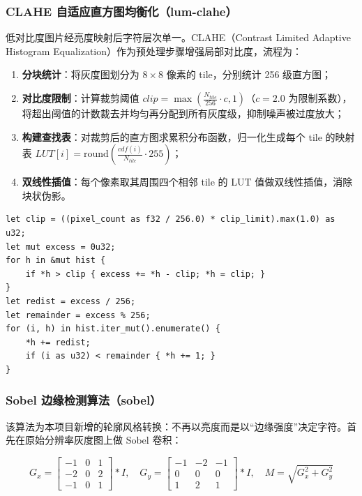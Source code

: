 \documentclass{SYSUReport}
\begin{document}
\subsubsection{CLAHE 自适应直方图均衡化（lum-clahe）}

低对比度图片经亮度映射后字符层次单一。CLAHE（Contrast Limited Adaptive Histogram Equalization）作为预处理步骤增强局部对比度，流程为：

\begin{enumerate}
    \item \textbf{分块统计}：将灰度图划分为 $8 \times 8$ 像素的 tile，分别统计 256 级直方图；
    \item \textbf{对比度限制}：计算裁剪阈值 $clip = \max(\frac{N_{tile}}{256} \cdot c, 1)$（$c=2.0$ 为限制系数），将超出阈值的计数裁去并均匀再分配到所有灰度级，抑制噪声被过度放大；
    \item \textbf{构建查找表}：对裁剪后的直方图求累积分布函数，归一化生成每个 tile 的映射表 $LUT[i] = \mathrm{round}(\frac{cdf(i)}{N_{tile}} \cdot 255)$；
    \item \textbf{双线性插值}：每个像素取其周围四个相邻 tile 的 LUT 值做双线性插值，消除块状伪影。
\end{enumerate}

\begin{lstlisting}[caption={直方图裁剪与再分配（ascii/clahe.rs）}]
let clip = ((pixel_count as f32 / 256.0) * clip_limit).max(1.0) as u32;
let mut excess = 0u32;
for h in &mut hist {
    if *h > clip { excess += *h - clip; *h = clip; }
}
let redist = excess / 256;
let remainder = excess % 256;
for (i, h) in hist.iter_mut().enumerate() {
    *h += redist;
    if (i as u32) < remainder { *h += 1; }
}
\end{lstlisting}

\subsubsection{Sobel 边缘检测算法（sobel）}

该算法为本项目新增的轮廓风格转换：不再以亮度而是以``边缘强度''决定字符。首先在原始分辨率灰度图上做 Sobel 卷积：

\begin{equation}
    G_x = \begin{bmatrix} -1 & 0 & 1 \\ -2 & 0 & 2 \\ -1 & 0 & 1 \end{bmatrix} * I, \quad
    G_y = \begin{bmatrix} -1 & -2 & -1 \\ 0 & 0 & 0 \\ 1 & 2 & 1 \end{bmatrix} * I, \quad
    M = \sqrt{G_x^2 + G_y^2}
\end{equation}
\end{document}
